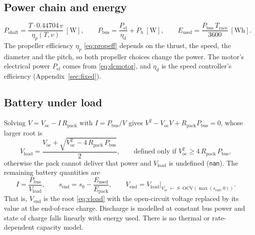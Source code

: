 \documentclass[11pt,a4paper]{article}
\renewcommand{\_}{\textunderscore\allowbreak}
\newcommand{\code}[1]{\texttt{#1}}
\newcommand{\Trace}{T_{\mathrm{race}}}
\newcommand{\Pshaft}{P_{\mathrm{shaft}}}
\newcommand{\Pbus}{P_{\mathrm{bus}}}
\newcommand{\Eused}{E_{\mathrm{used}}}
\newcommand{\Epack}{E_{\mathrm{pack}}}
\newcommand{\Voc}{V_{\mathrm{oc}}}
\newcommand{\Vload}{V_{\mathrm{load}}}
\newcommand{\Vend}{V_{\mathrm{end}}}
\newcommand{\Rpack}{R_{\mathrm{pack}}}
\begin{document}
\subsection{Power chain and energy}
\begin{equation}
  \Pshaft = \frac{T\cdot 0.44704\,v}{\eta_p(T,v)}\ [\mathrm W],\qquad
  \Pbus = \frac{P_{\mathrm{el}}}{\eta_d} + P_h\ [\mathrm W],\qquad
  \Eused = \frac{\Pbus\,\Trace}{3600}\ [\mathrm{Wh}].
  \label{eq:power}
\end{equation}
The propeller efficiency $\eta_p$ \eqref{eq:propeff} depends on the thrust, the speed, the diameter and the pitch, so both propeller choices change the power. The motor's electrical power $P_{\mathrm{el}}$ comes from \eqref{eq:dcmotor}, and $\eta_d$ is the speed controller's efficiency (Appendix~\ref{sec:fixed}).

\subsection{Battery under load}
Solving $V = \Voc - I\,\Rpack$ with $I=\Pbus/V$ gives $V^2-\Voc V+\Rpack\Pbus=0$, whose larger root is
\begin{equation}
  \Vload = \frac{\Voc + \sqrt{\Voc^2 - 4\,\Rpack\,\Pbus}}{2},
  \qquad \text{defined only if } \Voc^2 \ge 4\,\Rpack\,\Pbus,
  \label{eq:vload}
\end{equation}
otherwise the pack cannot deliver that power and $\Vload$ is undefined (\code{nan}). The remaining battery quantities are
\begin{equation}
  I = \frac{\Pbus}{\Vload},\qquad
  s_{\mathrm{end}} = s_0 - \frac{\Eused}{\Epack},\qquad
  \Vend = \Vload\Big|_{\Voc\,\leftarrow\,S\cdot\mathrm{OCV}(\max(s_{\mathrm{end}},0))}.
  \label{eq:current}
\end{equation}
That is, $\Vend$ is the root \eqref{eq:vload} with the open-circuit voltage replaced by its value at the end-of-race charge.
Discharge is modelled at constant bus power and state of charge falls linearly with energy used. There is no thermal or
rate-dependent capacity model.
\end{document}
